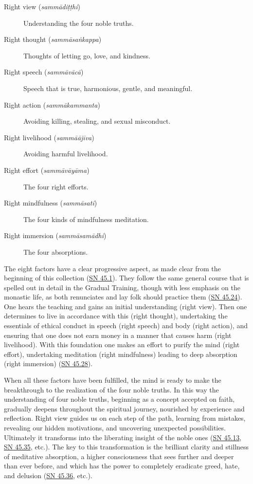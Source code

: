 \documentclass[12pt,openany]{book}%
\begin{document}
\begin{description}%
\item[Right view (\textit{\textsanskrit{sammādiṭṭhi}})] Understanding the four noble truths.%
\item[Right thought (\textit{\textsanskrit{sammāsaṅkappa}})] Thoughts of letting go, love, and kindness.%
\item[Right speech (\textit{\textsanskrit{sammāvācā}})] Speech that is true, harmonious, gentle, and meaningful.%
\item[Right action (\textit{\textsanskrit{sammākammanta}})] Avoiding killing, stealing, and sexual misconduct.%
\item[Right livelihood (\textit{\textsanskrit{sammāājīva}})] Avoiding harmful livelihood.%
\item[Right effort (\textit{\textsanskrit{sammāvāyāma}})] The four right efforts.%
\item[Right mindfulness (\textit{\textsanskrit{sammāsati}})] The four kinds of mindfulness meditation.%
\item[Right immersion (\textit{\textsanskrit{sammāsamādhi}})] The four absorptions.%
\end{description}

The eight factors have a clear progressive aspect, as made clear from the beginning of this collection (\href{https://suttacentral.net/sn45.1}{SN 45.1}). They follow the same general course that is spelled out in detail in the Gradual Training, though with less emphasis on the monastic life, as both renunciates and lay folk should practice them (\href{https://suttacentral.net/sn45.24}{SN 45.24}). One hears the teaching and gains an initial understanding (right view). Then one determines to live in accordance with this (right thought), undertaking the essentials of ethical conduct in speech (right speech) and body (right action), and ensuring that one does not earn money in a manner that causes harm (right livelihood). With this foundation one makes an effort to purify the mind (right effort), undertaking meditation (right mindfulness) leading to deep absorption (right immersion) (\href{https://suttacentral.net/sn45.28}{SN 45.28}).

When all these factors have been fulfilled, the mind is ready to make the breakthrough to the realization of the four noble truths. In this way the understanding of four noble truths, beginning as a concept accepted on faith, gradually deepens throughout the spiritual journey, nourished by experience and reflection. Right view guides us on each step of the path, learning from mistakes, revealing our hidden motivations, and uncovering unexpected possibilities. Ultimately it transforms into the liberating insight of the noble ones (\href{https://suttacentral.net/sn45.13}{SN 45.13}, \href{https://suttacentral.net/sn45.35}{SN 45.35}, etc.). The key to this transformation is the brilliant clarity and stillness of meditative absorption, a higher consciousness that sees further and deeper than ever before, and which has the power to completely eradicate greed, hate, and delusion (\href{https://suttacentral.net/sn45.36}{SN 45.36}, etc.).
\end{document}
